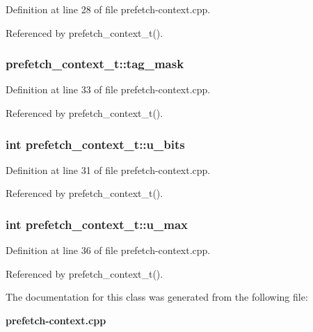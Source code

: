 Definition at line 28 of file prefetch-context.cpp.

Referenced by prefetch\_\-context\_\-t().
\subsubsection[{tag\_\-mask}]{ {\bf prefetch\_\-context\_\-t::tag\_\-mask}\hspace{0.3cm}{\tt  [protected]}}\label{classprefetch__context__t_89712d3e4c262bd51439c85f18f58a89}




Definition at line 33 of file prefetch-context.cpp.

Referenced by prefetch\_\-context\_\-t().
\subsubsection[{u\_\-bits}]{\setlength{\rightskip}{0pt plus 5cm}int {\bf prefetch\_\-context\_\-t::u\_\-bits}\hspace{0.3cm}{\tt  [protected]}}\label{classprefetch__context__t_79119d8d7adde560772d8eb31777a182}




Definition at line 31 of file prefetch-context.cpp.

Referenced by prefetch\_\-context\_\-t().
\subsubsection[{u\_\-max}]{\setlength{\rightskip}{0pt plus 5cm}int {\bf prefetch\_\-context\_\-t::u\_\-max}\hspace{0.3cm}{\tt  [protected]}}\label{classprefetch__context__t_53c9e5fbdbb7768eb0e106c00e2285b9}




Definition at line 36 of file prefetch-context.cpp.

Referenced by prefetch\_\-context\_\-t().

The documentation for this class was generated from the following file:\begin{CompactItemize}
\item 
{\bf prefetch-context.cpp}\end{CompactItemize}
